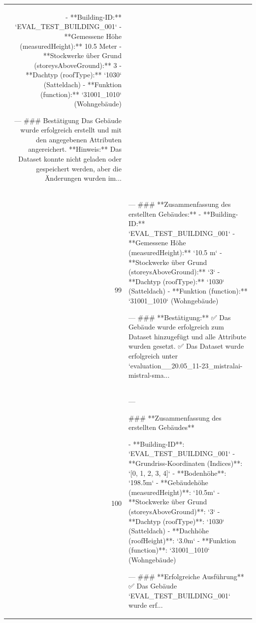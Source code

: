 \documentclass[a4paper,11pt]{article}
\begin{document}
\begin{table}[ht]
\begin{tabular}{r p{12cm}}
- **Building-ID:** `EVAL\_TEST\_BUILDING\_001`
- **Gemessene Höhe (measuredHeight):** 10.5 Meter
- **Stockwerke über Grund (storeysAboveGround):** 3
- **Dachtyp (roofType):** `1030` (Satteldach)
- **Funktion (function):** `31001\_1010` (Wohngebäude)

---
\#\#\# Bestätigung
Das Gebäude wurde erfolgreich erstellt und mit den angegebenen Attributen angereichert.
**Hinweis:** Das Dataset konnte nicht geladen oder gespeichert werden, aber die Änderungen wurden im... \\
99 & ---
\#\#\# **Zusammenfassung des erstellten Gebäudes:**
- **Building-ID:** `EVAL\_TEST\_BUILDING\_001`
- **Gemessene Höhe (measuredHeight):** `10.5 m`
- **Stockwerke über Grund (storeysAboveGround):** `3`
- **Dachtyp (roofType):** `1030` (Satteldach)
- **Funktion (function):** `31001\_1010` (Wohngebäude)

---
\#\#\# **Bestätigung:**
✅ Das Gebäude wurde erfolgreich zum Dataset hinzugefügt und alle Attribute wurden gesetzt.
✅ Das Dataset wurde erfolgreich unter `evaluation\_\_20.05\_11-23\_mistralai-mistral-sma... \\
100 & ---

\#\#\# **Zusammenfassung des erstellten Gebäudes**

- **Building-ID**: `EVAL\_TEST\_BUILDING\_001`
- **Grundriss-Koordinaten (Indices)**: `[0, 1, 2, 3, 4]`
- **Bodenhöhe**: `198.5m`
- **Gebäudehöhe (measuredHeight)**: `10.5m`
- **Stockwerke über Grund (storeysAboveGround)**: `3`
- **Dachtyp (roofType)**: `1030` (Satteldach)
- **Dachhöhe (roofHeight)**: `3.0m`
- **Funktion (function)**: `31001\_1010` (Wohngebäude)

---
\#\#\# **Erfolgreiche Ausführung**
✅ Das Gebäude `EVAL\_TEST\_BUILDING\_001` wurde erf... \\
\hline
\end{tabular}
\end{table}

\clearpage
\end{document}
